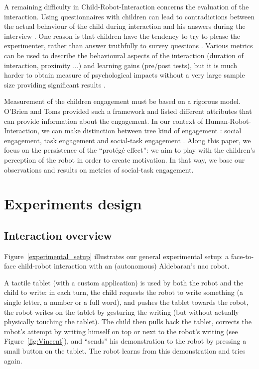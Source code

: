 \documentclass[conference]{IEEEtran}
\begin{document}
A remaining difficulty in Child-Robot-Interaction concerns the evaluation of the interaction. Using questionnaires with children can lead to contradictions between the actual behaviour of the child during interaction and his answers during the interview \cite{lemaignan2015youre}. One reason is that children have the tendency to try to please the experimenter, rather than answer truthfully to survey questions \cite{belpaeme2013child}. Various metrics can be used to describe the behavioural aspects of the interaction (duration of interaction, proximity ...) and learning gains (pre/post tests), but it is much harder to obtain measure of psychological impacts without a very large sample size providing significant results \cite{belpaeme2013child}. 

Measurement of the children engagement must be based on a rigorous model. O'Brien and Toms \cite{o2008user} provided such a framework and listed different attributes that can provide information about the engagement. In our context of Human-Robot-Interaction, we can make distinction between tree kind of engagement : social engagement, task engagement and social-task engagement \cite{corrigan2013social}. Along this paper, we focus on the persistence of the ``prot\'eg\'e effect'': we aim to play with the children's perception of the robot in order to create motivation. In that way, we base our observations and results on metrics of social-task engagement. 


\section{Experiments design}
\subsection{Interaction overview}
Figure~\ref{experimental_setup} illustrates our general experimental setup: a
face-to-face child-robot interaction with an (autonomous) Aldebaran's {\sc nao}
robot.

A tactile tablet (with a custom application) is used by both the robot and the
child to write: in each turn, the child requests the robot to write
something (a single letter, a number or a full word), and pushes the tablet
towards the robot, the robot writes on the tablet by gesturing the writing (but
without actually physically touching the tablet). The child then pulls back the
tablet, corrects the robot's attempt by writing himself on top or next to
the robot's writing (see Figure~\ref{fig:Vincent}), and ``sends'' his
demonstration to the robot by pressing a small button on the tablet. The robot
learns from this demonstration and tries again.
\end{document}
